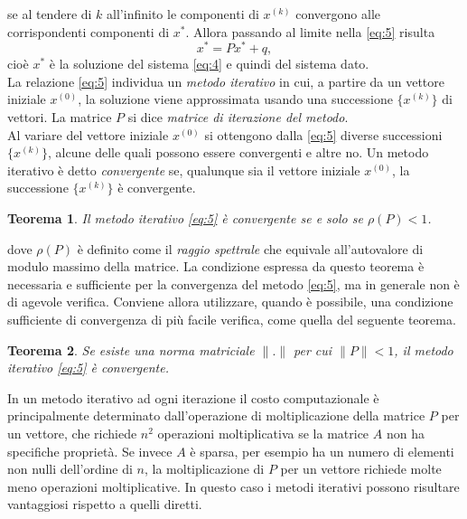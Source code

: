 \documentclass[12pt]{article}
\newtheorem*{remark}{Teorema}
\begin{document}
se al tendere di \(k\) all'infinito le componenti di \(x^{(k)}\) convergono alle corrispondenti componenti di \(x^*\). Allora passando al limite nella \eqref{eq:5} risulta
\begin{equation}
    x^*=Px^*+q,
\end{equation}
cioè \(x^*\) è la soluzione del sistema \eqref{eq:4} e quindi del sistema dato.\\
La relazione \eqref{eq:5} individua un \textit{metodo iterativo} in cui, a partire da un vettore iniziale \(x^{(0)}\), la soluzione viene approssimata usando una successione \(\{x^{(k)}\}\) di vettori. La matrice \(P\) si dice \textit{matrice di iterazione del metodo}.\\
Al variare del vettore iniziale \(x^{(0)}\) si ottengono dalla \eqref{eq:5} diverse successioni \(\{x^{(k)}\}\), alcune delle quali possono essere convergenti e altre no. Un metodo iterativo è detto \textit{convergente} se, qualunque sia il vettore iniziale \(x^{(0)}\), la successione \(\{x^{(k)}\}\) è convergente.
\begin{remark}
Il metodo iterativo \eqref{eq:5} è convergente se e solo se \(\rho(P)<1\).
\end{remark}
dove \(\rho(P)\) è definito come il \textit{raggio spettrale} che equivale all'autovalore di modulo massimo della matrice. La condizione espressa da questo teorema è necessaria e sufficiente per la convergenza del metodo \eqref{eq:5}, ma in generale non è di agevole verifica. Conviene allora utilizzare, quando è possibile, una condizione sufficiente di convergenza di più facile verifica, come quella del seguente teorema.
\begin{remark}
Se esiste una norma matriciale \(\|.\|\) per cui \(\|P\|<1\), il metodo iterativo \eqref{eq:5} è convergente.
\end{remark}
In un metodo iterativo ad ogni iterazione il costo computazionale è principalmente determinato dall'operazione di moltiplicazione della matrice \(P\) per un vettore, che richiede \(n^2\) operazioni moltiplicativa se la matrice \(A\) non ha specifiche proprietà. Se invece \(A\) è sparsa, per esempio ha un numero di elementi non nulli dell'ordine di \(n\), la moltiplicazione di \(P\) per un vettore richiede molte meno operazioni moltiplicative. In questo caso i metodi iterativi possono risultare vantaggiosi rispetto a quelli diretti.
\end{document}
